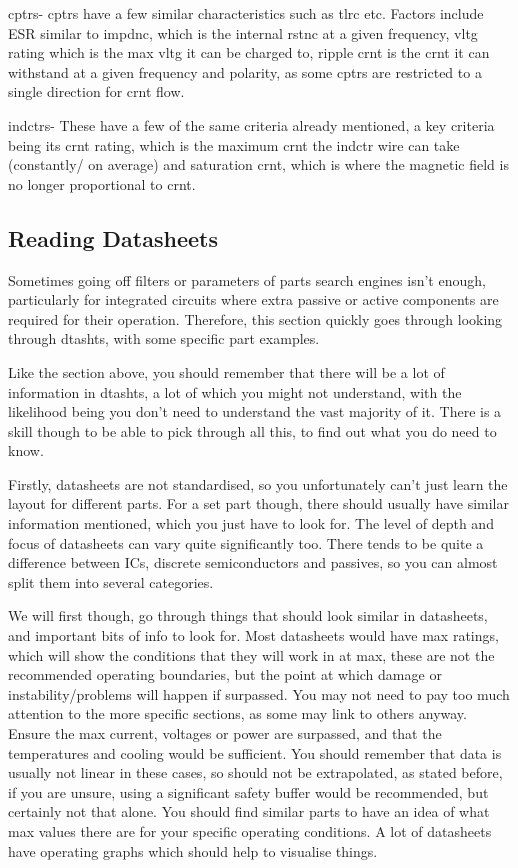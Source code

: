 \documentclass[a4paper,11pt]{report}
\begin{document}
\gls{cptr}s- \gls{cptr}s have a few similar characteristics such as \gls{tlrc} etc. Factors include ESR similar to \gls{impdnc}, which is the internal \gls{rstnc} at a given frequency, \gls{vltg} rating which is the max \gls{vltg} it can be charged to, ripple \gls{crnt} is the \gls{crnt} it can withstand at a given frequency and polarity, as some \gls{cptr}s are restricted to a single direction for \gls{crnt} flow.

\gls{indctr}s- These have a few of the same criteria already mentioned, a key criteria being its \gls{crnt} rating, which is the maximum \gls{crnt} the \gls{indctr} wire can take (constantly/ on average) and saturation \gls{crnt}, which is where the magnetic field is no longer proportional to \gls{crnt}.

\vspace*{1\baselineskip}

\subsection{Reading Datasheets}

Sometimes going off filters or parameters of parts search engines isn't enough, particularly for integrated circuits where extra passive or active components are required for their operation. Therefore, this section quickly goes through looking through \gls{dtasht}s, with some specific part examples.

Like the section above, you should remember that there will be a lot of information in \gls{dtasht}s, a lot of which you might not understand, with the likelihood being you don't need to understand the vast majority of it. There is a skill though to be able to pick through all this, to find out what you do need to know.

Firstly, datasheets are not standardised, so you unfortunately can't just learn the layout for different parts. For a set part though, there should usually have similar information mentioned, which you just have to look for. The level of depth and focus of datasheets can vary quite significantly too. There tends to be quite a difference between ICs, discrete semiconductors and passives, so you can almost split them into several categories.

We will first though, go through things that should look similar in datasheets, and important bits of info to look for. Most datasheets would have max ratings, which will show the conditions that they will work in at max, these are not the recommended operating boundaries, but the point at which damage or instability/problems will happen if surpassed. You may not need to pay too much attention to the more specific sections, as some may link to others anyway. Ensure the max current, voltages or power are surpassed, and that the temperatures and cooling would be sufficient. You should remember that data is usually not linear in these cases, so should not be extrapolated, as stated before, if you are unsure, using a significant safety buffer would be recommended, but certainly not that alone. You should find similar parts to have an idea of what max values there are for your specific operating conditions. A lot of datasheets have operating graphs which should help to visualise things.
\end{document}
